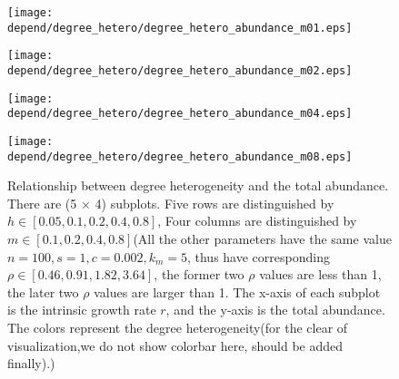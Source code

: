 \documentclass[a4paper,fleqn,12pt]{article}
\begin{document}
\begin{figure}[htbp]
\begin{minipage}{0.22\linewidth}
  \texttt{[image: depend/degree\_hetero/degree\_hetero\_abundance\_m01.eps]}
\end{minipage}
\hfill
\begin{minipage}{0.22\linewidth}
  \texttt{[image: depend/degree\_hetero/degree\_hetero\_abundance\_m02.eps]}
\end{minipage}
\hfill
\begin{minipage}{0.22\linewidth}
  \texttt{[image: depend/degree\_hetero/degree\_hetero\_abundance\_m04.eps]}
\end{minipage}
\hfill
\begin{minipage}{0.22\linewidth}
  \texttt{[image: depend/degree\_hetero/degree\_hetero\_abundance\_m08.eps]}
\end{minipage}
\caption{Relationship between degree heterogeneity and the total abundance.
There are (5 $\times$ 4) subplots. Five rows are distinguished by $h \in [0.05, 0.1, 0.2, 0.4, 0.8]$, Four columns are distinguished by $m \in [0.1,0.2,0.4,0.8]$(All the other parameters have the same value $n = 100, s = 1, c = 0.002, k_m = 5$, thus have corresponding $\rho \in [0.46,0.91,1.82,3.64]$, the former two $\rho$ values are less than 1, the later two $\rho$ values are larger than 1.
The x-axis of each subplot is the intrinsic growth rate $r$, and the y-axis is the total abundance. The colors represent the degree heterogeneity({\color{red}for the clear of visualization,we do not show colorbar here, should be added finally}).)}
\label{fig:degree-hetero-abundance}
\end{figure}
\end{document}
